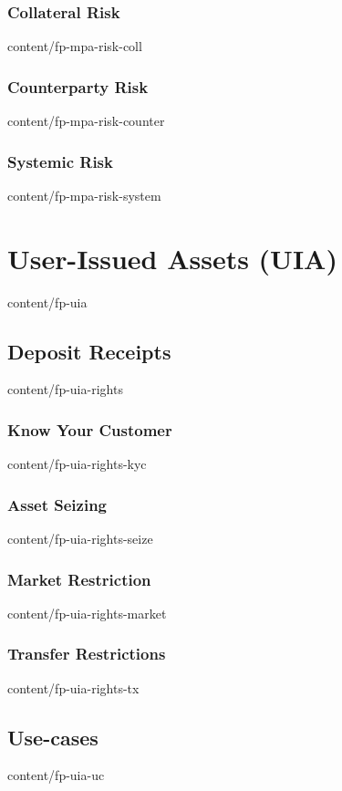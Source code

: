 \documentclass[conference,final,10pt,a4paper]{IEEEtran}
\begin{document}
\subsubsection { Collateral Risk                                 }  { content/fp-mpa-risk-coll       } 
\subsubsection { Counterparty Risk                               }  { content/fp-mpa-risk-counter    } 
\subsubsection { Systemic Risk                                   }  { content/fp-mpa-risk-system     } 

\section       { User-Issued Assets (UIA)                        }  { content/fp-uia                 } 
\subsection    { Deposit Receipts                                }  { content/fp-uia-rights          } 
\subsubsection { Know Your Customer                              }  { content/fp-uia-rights-kyc      } 
\subsubsection { Asset Seizing                                   }  { content/fp-uia-rights-seize    } 
\subsubsection { Market Restriction                              }  { content/fp-uia-rights-market   } 
\subsubsection { Transfer Restrictions                           }  { content/fp-uia-rights-tx       } 
\subsection    { Use-cases                                       }  { content/fp-uia-uc              } 
\end{document}
